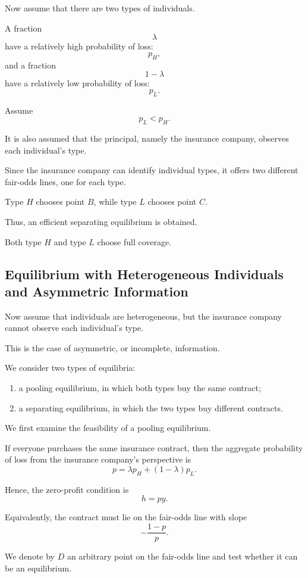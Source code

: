 Now assume that there are two types of individuals.

A fraction
\[
\lambda
\]
have a relatively high probability of loss:
\[
p_H,
\]
and a fraction
\[
1-\lambda
\]
have a relatively low probability of loss:
\[
p_L.
\]

Assume
\[
p_L<p_H.
\]

It is also assumed that the principal, namely the insurance company, observes each individual's type.




Since the insurance company can identify individual types, it offers two different fair-odds lines, one for each type.

Type \(H\) chooses point \(B\), while type \(L\) chooses point \(C\).

Thus, an efficient separating equilibrium is obtained.

Both type \(H\) and type \(L\) choose full coverage.

\subsection{Equilibrium with Heterogeneous Individuals and Asymmetric Information}

Now assume that individuals are heterogeneous, but the insurance company cannot observe each individual's type.

This is the case of asymmetric, or incomplete, information.

We consider two types of equilibria:

\begin{enumerate}
    \item a pooling equilibrium, in which both types buy the same contract;
    \item a separating equilibrium, in which the two types buy different contracts.
\end{enumerate}

We first examine the feasibility of a pooling equilibrium.

If everyone purchases the same insurance contract, then the aggregate probability of loss from the insurance company's perspective is
\[
p
=
\lambda p_H+(1-\lambda)p_L.
\]

Hence, the zero-profit condition is
\[
h=py.
\]

Equivalently, the contract must lie on the fair-odds line with slope
\[
-\frac{1-p}{p}.
\]

We denote by \(D\) an arbitrary point on the fair-odds line and test whether it can be an equilibrium.

